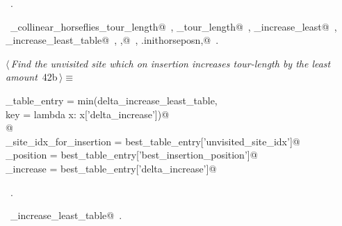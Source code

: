\documentclass[11.5pt]{report}
\begin{document}
\begin{flushleft}
\begin{list}{}{}
\mbox{}\verb@                                   'delta_increase'          : delta_increase_least})@\\
\mbox{}\verb@@{\NWsep}
\end{list}
\vspace{-1.5ex}
\footnotesize
\begin{list}{}{\setlength{\itemsep}{-\parsep}\setlength{\itemindent}{-\leftmargin}}
\item \NWtxtMacroRefIn\ .
\item \NWtxtIdentsUsed\nobreak\  \verb@compute_collinear_horseflies_tour_length@\nobreak\ , \verb@current_tour_length@\nobreak\ , \verb@delta_increase_least@\nobreak\ , \verb@delta_increase_least_table@\nobreak\ , \verb@ibest,@\nobreak\ , \verb@self.inithorseposn,@\nobreak\ .
\item{}
\end{list}
\vspace{4ex}
\end{flushleft}


\vspace{-0.8cm}\newchunk 

\begin{flushleft} \small\label{scrap63}\raggedright\small
{} $\langle\,${\itshape Find the unvisited site which on insertion increases tour-length by the least amount}\nobreak\ {\footnotesize {42b}}$\,\rangle\equiv$
\vspace{-1ex}
\begin{list}{}{} \item
\mbox{}\verb@best_table_entry = min(delta_increase_least_table, \@\\
\mbox{}\verb@                         key = lambda x: x['delta_increase'])@\\
\mbox{}\verb@         @\\
\mbox{}\verb@unvisited_site_idx_for_insertion = best_table_entry['unvisited_site_idx']@\\
\mbox{}\verb@insertion_position               = best_table_entry['best_insertion_position']@\\
\mbox{}\verb@delta_increase                   = best_table_entry['delta_increase']@\\
\mbox{}\verb@@{\NWsep}
\end{list}
\vspace{-1.5ex}
\footnotesize
\begin{list}{}{\setlength{\itemsep}{-\parsep}\setlength{\itemindent}{-\leftmargin}}
\item \NWtxtMacroRefIn\ .
\item \NWtxtIdentsUsed\nobreak\  \verb@delta_increase_least_table@\nobreak\ .
\item{}
\end{list}
\vspace{4ex}
\end{flushleft}
\end{document}

